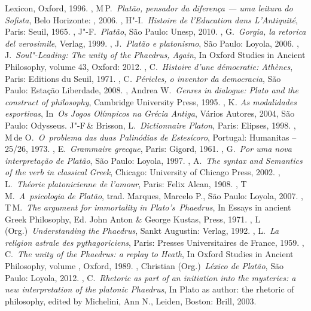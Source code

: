 {\begin{bibliohedra}
{  Lexicon}, Oxford, 1996.
, M\,P.~\emph{Platão, pensador da diferença --- uma leitura do
  Sofista}, Belo Horizonte: , 2006.
, H"-I.~\emph{Histoire de l'Education dans L'Antiquité}, Paris:
  Seuil, 1965.
, J"-F.~\emph{Platão}, São Paulo: Unesp, 2010.
, G.~\emph{Gorgia, la retorica del verosimile}, Verlag, 1999.
, J.~\emph{Platão e platonismo}, São Paulo: Loyola, 2006.
, J.~\emph{Soul"-Leading: The unity of the Phaedrus, Again}, In
  Oxford Studies in Ancient Philosophy, volume 43, Oxford: 2012.
, C.~\emph{Histoire d'une démocratie: Athènes}, Paris: Editions
  du Seuil, 1971.
, C\emph{. Péricles, o inventor da democracia}, São Paulo:
  Estação Liberdade, 2008.
, Andrea W.~\emph{Genres in dialogue: Plato and the
  construct of philosophy}, Cambridge University Press, 1995.
, K\emph{. As modalidades esportivas}, In~\emph{Os Jogos
  Olímpicos na Grécia Antiga}, Vários Autores, 2004, São Paulo:
  Odysseus.
 J"-F\,\& Brisson, L.~\emph{Dictionnaire Platon}, Paris:
  Elipses, 1998.
, M\,de O.~\emph{O~problema das duas Palinódias de
  Estesícoro}, Portugal: Humanitas -- 25/\allowbreak{}26, 1973.
, E.~\emph{Grammaire grecque}, Paris: Gigord, 1961.
, G.~\emph{Por uma nova interpretação de Platão}, São Paulo:
  Loyola, 1997.
, A.~\emph{The syntax and Semantics of the verb in classical
  Greek}, Chicago: University of Chicago Press, 2002.
, L.~\emph{Théorie platonicienne de l'amour}, Paris: Felix Alcan,
  1908.
, T\,M.~\emph{A~psicologia de Platão}, trad. Marques, Marcelo
  P., São Paulo: Loyola, 2007.
, T\,M.~\emph{The argument for immortality in
  Plato's}~\emph{Phaedrus}, In Essays in ancient Greek Philosophy, Ed.
  John Anton \& George Kustas,  Press, 1971.
, L\,(Org.)~\emph{Understanding the Phaedrus}, Sankt Augustin:
  Verlag, 1992.
, L.~\emph{La religion astrale des pythagoriciens}, Paris:
  Presses Universitaires de France, 1959.
, C.~\emph{The unity of the Phaedrus: a replay to Heath}, In
  Oxford Studies in Ancient Philosophy, volume , Oxford, 1989.
, Christian (Org.)~\emph{Léxico de Platão}, São Paulo: Loyola,
  2012.
, C.~\emph{Rhetoric as part of an initiation into the
  mysteries: a new interpretation of the platonic Phaedrus}, In Plato as
  author: the rhetoric of philosophy, edited by Michelini, Ann N.,
  Leiden, Boston: Brill, 2003.

\end{bibliohedra}}
